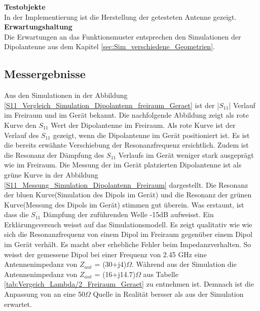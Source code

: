 \textbf{Testobjekte}\\
In der Implementierung ist die Herstellung der getesteten Antenne gezeigt. 
\textbf{Erwartungshaltung}\\
Die Erwartungen an das Funktionsmuster entsprechen den Simulationen der Dipolantenne aus dem Kapitel \ref{sec:Sim_verschiedene_Geometrien}.\\

\subsection{Messergebnisse}
Aus den Simulationen in der Abbildung \ref{S11_Vergleich_Simulation_Dipolantenn_freiraum_Geraet} ist der |$S_{11}$| Verlauf im Freiraum und im Gerät bekannt. Die nachfolgende Abbildung zeigt als rote Kurve den $S_{11}$ Wert der Dipolantenne im Freiraum. Als rote Kurve ist der Verlauf des $S_{11}$ gezeigt, wenn die Dipolantenne im Gerät positioniert ist. Es ist die bereits erwähnte Verschiebung der Resonanzfrequenz ersichtlich. Zudem ist die Resonanz der Dämpfung des $S_{11}$ Verlaufs im Gerät weniger stark ausgeprägt wie im Freiraum. Die Messung der im Gerät platzierten Dipolantenne ist als grüne Kurve in der Abbildung \ref{S11_Messung_Simulation_Dipolantenn_Freiraum} dargestellt. Die Resonanz der bluen Kurve(Simulation des Dipols im Gerät) und die Resonanz der grünen Kurve(Messung des Dipols im Gerät) stimmen gut überein. Was erstaunt, ist dass die $S_{11}$ Dämpfung der zuführenden Welle -15dB aufweisst. Ein Erklärungsversuch weisst auf das Simulationsmodell. Es zeigt qualitativ wie wie sich die Resonanzfrequenz von einem Dipol im Freiraum gegenüber einem Dipol im Gerät verhält. Es macht aber erhebliche Fehler beim Impedanzverhalten. So weisst der gemessene Dipol bei einer Frequenz von 2.45 GHz eine Antennenimpedanz von $Z_{ant}$ = (30+j4)$\Omega$. Während aus der Simulation die Antennenimpedanz von $Z_{ant}$ = (16+j14.7)$\Omega$ aus Tabelle \ref{tab:Vergeich_Lambda/2_Freiraum_Geraet} zu entnehmen ist. Demnach ist die Anpassung von an eine 50$\Omega$ Quelle in Realität bersser als aus der Simulation erwartet.


%	

